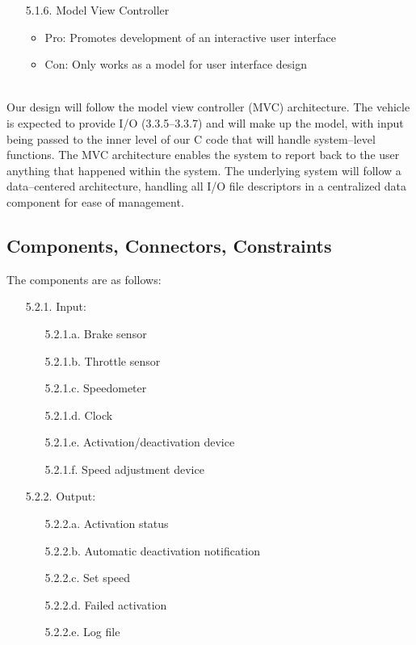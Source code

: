 \documentclass{article}
\begin{document}
\begin{enumerate}
		\item[5.1.6.] Model View Controller
		\begin{itemize}
			\item Pro: Promotes development of an interactive user interface
			\item Con: Only works as a model for user interface design
		\end{itemize}	
	\end{enumerate}
	
	\ \\ \indent Our design will follow the model view controller (MVC) architecture. The vehicle is expected to provide I/O (3.3.5--3.3.7) and will make up the model, with input being passed to the inner level of our C code that will handle system--level functions. The MVC architecture enables the system to report back to the user anything that happened within the system. The underlying system will follow a data--centered architecture, handling all I/O file descriptors in a centralized data component for ease of management.
	
	\subsection{Components, Connectors, Constraints}
	\indent\indent The components are as follows:
	\begin{enumerate}
		\item[5.2.1.] Input:
		\begin{enumerate}
			\item[5.2.1.a.] Brake sensor
			\item[5.2.1.b.] Throttle sensor
			\item[5.2.1.c.] Speedometer
			\item[5.2.1.d.] Clock
			\item[5.2.1.e.] Activation/deactivation device
			\item[5.2.1.f.] Speed adjustment device
		\end{enumerate}
		\item[5.2.2.] Output:
		\begin{enumerate}
			\item[5.2.2.a.] Activation status
			\item[5.2.2.b.] Automatic deactivation notification
			\item[5.2.2.c.] Set speed
			\item[5.2.2.d.] Failed activation
			\item[5.2.2.e.] Log file
		\end{enumerate}
	\end{enumerate}
	
\end{document}
